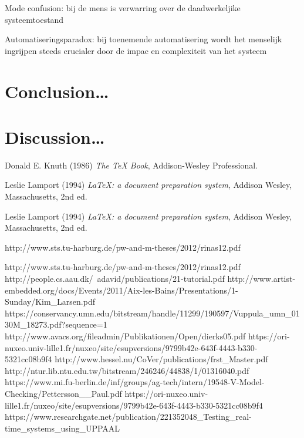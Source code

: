 \documentclass[a4paper,12pt]{article}
\begin{document}
Mode confusion: bij de mens is verwarring over de daadwerkeljike systeemtoestand

Automatiseringsparadox: bij toenemende automatisering wordt het menselijk ingrijpen steeds crucialer door de impac en complexiteit van het systeem

\section{Conclusion\dots}\newpage
\section{Discussion\dots}
{}


\begin{thebibliography}{9}
Donald E. Knuth (1986) \emph{The \TeX{} Book}, Addison-Wesley Professional.

Leslie Lamport (1994) \emph{\LaTeX: a document preparation system}, Addison
Wesley, Massachusetts, 2nd ed.




Leslie Lamport (1994) \emph{\LaTeX: a document preparation system}, Addison
Wesley, Massachusetts, 2nd ed.



http://www.sts.tu-harburg.de/pw-and-m-theses/2012/rinas12.pdf

http://www.sts.tu-harburg.de/pw-and-m-theses/2012/rinas12.pdf
http://people.cs.aau.dk/~adavid/publications/21-tutorial.pdf
http://www.artist-embedded.org/docs/Events/2011/Aix-les-Bains/Presentations/1-Sunday/Kim_Larsen.pdf
https://conservancy.umn.edu/bitstream/handle/11299/190597/Vuppula_umn_0130M_18273.pdf?sequence=1
http://www.avacs.org/fileadmin/Publikationen/Open/dierks05.pdf
https://ori-nuxeo.univ-lille1.fr/nuxeo/site/esupversions/9799b42e-643f-4443-b330-5321cc08b9f4
http://www.hessel.nu/CoVer/publications/frst_Master.pdf
http://ntur.lib.ntu.edu.tw/bitstream/246246/44838/1/01316040.pdf
https://www.mi.fu-berlin.de/inf/groups/ag-tech/intern/19548-V-Model-Checking/Pettersson__Paul.pdf
https://ori-nuxeo.univ-lille1.fr/nuxeo/site/esupversions/9799b42e-643f-4443-b330-5321cc08b9f4
https://www.researchgate.net/publication/221352048_Testing_real-time_systems_using_UPPAAL


\end{thebibliography}
\end{document}
